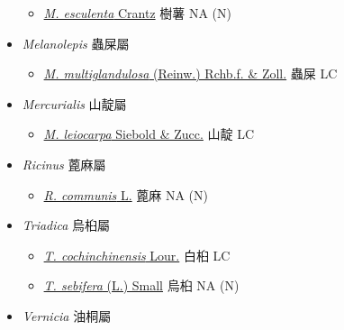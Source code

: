 \begin{itemize}
  \begin{itemize}
        \item[] \href{http://www.theplantlist.org/tpl1.1/search?q=Manihot+esculenta}{\textit{M. esculenta} Crantz}   樹薯   NA (N)
  \end{itemize}
 \item[] \textit{Melanolepis} 蟲屎屬
                                
  \begin{itemize}
        \item[] \href{http://www.theplantlist.org/tpl1.1/search?q=Melanolepis+multiglandulosa}{\textit{M. multiglandulosa} (Reinw.) Rchb.f. \& Zoll.}   蟲屎   LC
  \end{itemize}
 \item[] \textit{Mercurialis} 山靛屬
                                
  \begin{itemize}
        \item[] \href{http://www.theplantlist.org/tpl1.1/search?q=Mercurialis+leiocarpa}{\textit{M. leiocarpa} Siebold \& Zucc.}   山靛   LC
  \end{itemize}
 \item[] \textit{Ricinus} 蓖麻屬
                                
  \begin{itemize}
        \item[] \href{http://www.theplantlist.org/tpl1.1/search?q=Ricinus+communis}{\textit{R. communis} L.}   蓖麻   NA (N)
  \end{itemize}
 \item[] \textit{Triadica} 烏桕屬
                                
  \begin{itemize}
        \item[] \href{http://www.theplantlist.org/tpl1.1/search?q=Triadica+cochinchinensis}{\textit{T. cochinchinensis} Lour.}   白桕   LC
        \item[] \href{http://www.theplantlist.org/tpl1.1/search?q=Triadica+sebifera}{\textit{T. sebifera} (L.) Small}   烏桕   NA (N)
  \end{itemize}
 \item[] \textit{Vernicia} 油桐屬
                                

\end{itemize}
